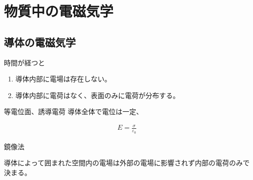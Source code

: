 \documentclass[uplatex,dvipdfmx,a4paper,11pt]{jlreq}
\numberwithin{equation}{section}
\theoremstyle{definition}
\begin{document}
\begin{theorem}[Fresnel 回折]
\end{theorem}



\section{物質中の電磁気学}


\subsection{導体の電磁気学}
\begin{definition}[導体]
  時間が経つと
  \begin{enumerate}
    \item 導体内部に電場は存在しない。
    \item 導体内部に電荷はなく、表面のみに電荷が分布する。
  \end{enumerate}
  等電位面、誘導電荷
  導体全体で電位は一定、
\end{definition}

\begin{theorem}
  \begin{align}
    E = \frac{\sigma}{\varepsilon_0}
  \end{align}
\end{theorem}

\begin{proposition}[一様に分極した誘電体球の分極電場]
\end{proposition}

\begin{proposition}[一様に分極した回転楕円体形状の誘電体の分極電場]
\end{proposition}

\begin{theorem}[静電誘導]

\end{theorem}

\begin{proposition}[半無限導体と点電荷]
  鏡像法
\end{proposition}

\begin{proposition}[一様外部電場中の導体球]
\end{proposition}

\begin{definition}[静電遮蔽]
  導体によって囲まれた空間内の電場は外部の電場に影響されず内部の電荷のみで決まる。
\end{definition}
\end{document}
